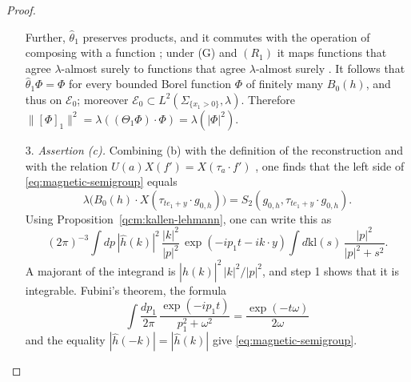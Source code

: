 \documentclass[11pt,letterpaper,reqno]{amsart}
\theoremstyle{definition}
\begin{document}
\begin{proof}
\begin{enumerate}
Further, $\hat\theta_1$ preserves products, and it commutes with the operation of composing with a function \cite[Sections~5.2 and~7.4]{QEDConstruction}; under (G) and $(R_1)$ it maps functions that agree $\lambda$-almost surely to functions that agree $\lambda$-almost surely \cite[Proposition~5.1]{QEDConstruction}.
It follows that $\hat\theta_1\Phi=\Phi$ for every bounded Borel function $\Phi$ of finitely many $B_0(h)$, and thus on $\mathcal E_0$; moreover $\mathcal E_0\subset L^2(\Sigma_{\{x_1>0\}},\lambda)$.
Therefore $\|[\Phi]_1\|^2=\allowbreak \lambda((\Theta_1\Phi)\cdot\Phi)=\allowbreak \lambda(|\Phi|^2)$.
\item[3.] \emph{Assertion (c).}
Combining (b) with the definition of the reconstruction and with the relation $U(a)X(f')=X(\tau_a\cdot f')$ \cite[Proposition~5.1]{QEDConstruction}, one finds that the left side of \eqref{eq:magnetic-semigroup} equals
\begin{equation*}
\lambda\bigl(B_0(h)\cdot X(\tau_{te_1+y}\cdot g_{0,h})\bigr)=S_2(g_{0,h},\tau_{te_1+y}\cdot g_{0,h}).
\end{equation*}
Using Proposition~\ref{qcm:kallen-lehmann}, one can write this as
\begin{equation*}
(2\pi)^{-3}\int dp\,|\hat h(k)|^2\,\frac{|k|^2}{|p|^2}\,\exp(-ip_1t-ik\cdot y)\int d\mathrm{kl}(s)\,\frac{|p|^2}{|p|^2+s^2}.
\end{equation*}
A majorant of the integrand is $|\hat h(k)|^2\,|k|^2/|p|^2$, and step 1 shows that it is integrable.
Fubini's theorem, the formula
\begin{equation*}
\int\frac{dp_1}{2\pi}\,\frac{\exp(-ip_1t)}{p_1^2+\omega^2}=\frac{\exp(-t\omega)}{2\omega}
\end{equation*}
and the equality $|\hat h(-k)|=|\hat h(k)|$ give \eqref{eq:magnetic-semigroup}.


\end{enumerate}
\end{proof}
\end{document}
